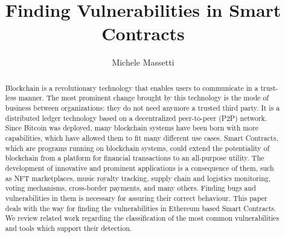 \documentclass[a4paper,sigconf, language=french,
language=german, language=spanish, language=english]{acmart}
\begin{document}
\title{Finding Vulnerabilities in Smart Contracts}


\author{Michele Massetti}

\renewcommand{\shortauthors}{Massetti.}

\begin{abstract}
Blockchain is a revolutionary technology that enables users to communicate in a trust-less manner. 
The most prominent change brought by this technology is the mode of business between organizations: they do not need anymore a trusted third party. 
It is a distributed ledger technology based on a decentralized peer-to-peer (P2P) network. 
Since Bitcoin was deployed, many blockchain systems have been born with more capabilities, which have allowed them to fit many
different use cases. Smart Contracts, which are programs running on blockchain systems, could extend the potentiality of blockchain
from a platform for financial transactions to an all-purpose utility.
The development of innovative and prominent applications is a consequence of them, such as NFT marketplaces, music royalty tracking, supply chain and logistics monitoring, voting mechanisms, 
cross-border payments, and many others.
Finding bugs and vulnerabilities in them is necessary for assuring their correct behaviour. 
This paper deals with the way for finding the vulnerabilities in Ethereum based Smart Contracts. We review related work regarding 
the classification of the most common vulnerabilities and tools which support their detection.
\end{abstract}
\end{document}
